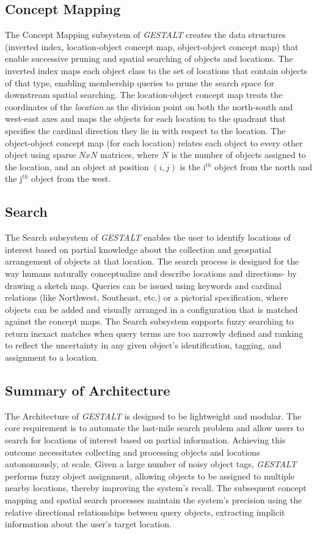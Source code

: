 \subsection{Concept Mapping}
The Concept Mapping subsystem of \emph{GESTALT} creates the data structures (inverted index, location-object concept map, object-object concept map) that enable successive pruning and spatial searching of objects and locations. 
The inverted index maps each object class to the set of locations that contain objects of that type, enabling membership queries to prune the search space for downstream spatial searching. 
The location-object concept map treats the coordinates of the \textit{location} as the division point on both the north-south and west-east axes and maps the objects for each location to the quadrant that specifies the cardinal direction they lie in with respect to the location.
The object-object concept map (for each location) relates each object to every other object using sparse $NxN$ matrices, where $N$ is the number of objects assigned to the location, and an object at position $(i,j)$ is the i$^{th}$ object from the north and the j$^{th}$ object from the west. 

\subsection{Search}

The Search subsystem of \emph{GESTALT} enables the user to identify locations of interest based on partial knowledge about the collection and geospatial arrangement of objects at that location. 
The search process is designed for the way humans naturally conceptualize and describe locations and directions- by drawing a sketch map.
Queries can be issued using keywords and cardinal relations (like Northwest, Southeast, etc.) or a pictorial specification, where objects can be added and visually arranged in a configuration that is matched against the concept maps.
The Search subsystem supports fuzzy searching to return inexact matches when query terms are too narrowly defined and ranking to reflect the uncertainty in any given object's identification, tagging, and assignment to a location.

\subsection{Summary of Architecture}
The Architecture of \textit{GESTALT} is designed to be lightweight and modular. The core requirement is to automate the last-mile search problem and allow users to search for locations of interest based on partial information. 
Achieving this outcome necessitates collecting and processing objects and locations autonomously, at scale.
Given a large number of noisy object tags, \emph{GESTALT} performs fuzzy object assignment, allowing objects to be assigned to multiple nearby locations, thereby improving the system's recall.
The subsequent concept mapping and spatial search processes maintain the system's precision using the relative directional relationships between query objects, extracting implicit information about the user's target location. 

